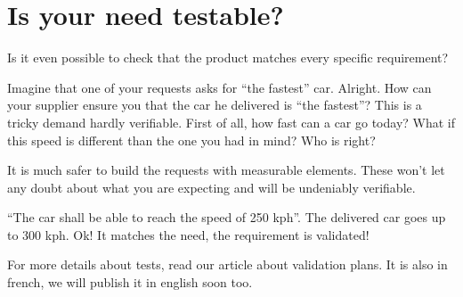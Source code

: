 \section{Is your need testable?}
Is it even possible to check that the product matches every specific requirement?

Imagine that one of your requests asks for “the fastest” car. Alright. How can your supplier ensure you that the car he delivered is “the fastest”? This is a tricky demand hardly verifiable. First of all, how fast can a car go today? What if this speed is different than the one you had in mind? Who is right?

It is much safer to build the requests with measurable elements. These won’t let any doubt about what you are expecting and will be undeniably verifiable.

“The car shall be able to reach the speed of 250 kph”. The delivered car goes up to 300 kph. Ok! It matches the need, the requirement is validated!

For more details about tests, read our article about validation plans. It is also in french, we will publish it in english soon too.

